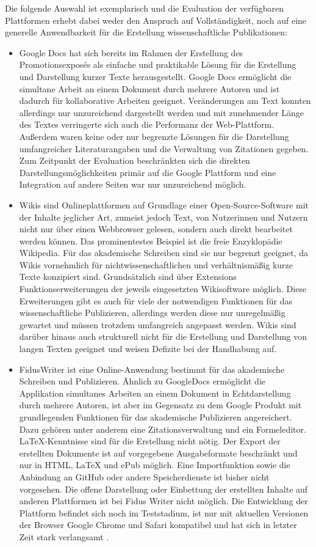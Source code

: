 Die folgende Auswahl ist exemplarisch und die Evaluation der verfügbaren Plattformen erhebt dabei weder den Anspruch auf Vollständigkeit, noch auf eine generelle Anwendbarkeit für die Erstellung wissenschaftliche Publikationen:
\begin{itemize}
\item Google Docs hat sich bereits im Rahmen der Erstellung des Promotionsexposés als einfache und praktikable Lösung für die Erstellung und Darstellung kurzer Texte herausgestellt. Google Docs ermöglicht die simultane Arbeit an einem Dokument durch mehrere Autoren und ist dadurch für kollaborative Arbeiten geeignet. Veränderungen am Text konnten allerdings nur unzureichend dargestellt werden und mit zunehmender Länge des Textes verringerte sich auch die Performanz der Web-Plattform. Außerdem waren keine oder nur begrenzte Lösungen für die Darstellung umfangreicher Literaturangaben und die Verwaltung von Zitationen gegeben. Zum Zeitpunkt der Evaluation beschränkten sich die direkten Darstellungsmöglichkeiten primär auf die Google Plattform und eine Integration auf andere Seiten war nur unzureichend möglich.
\item Wikis sind Onlineplattformen auf Grundlage einer Open-Source-Software mit der Inhalte jeglicher Art, zumeist jedoch Text, von Nutzerinnen und Nutzern nicht nur über einen Webbrowser gelesen, sondern auch direkt bearbeitet werden können. Das prominentestes Beispiel ist die freie Enzyklopädie Wikipedia. Für das akademische Schreiben sind sie nur begrenzt geeignet, da Wikis vornehmlich für nichtwissenschaftlichen und verhältnismäßig kurze Texte konzipiert sind. Grundsätzlich sind über Extensions Funktionserweiterungen der jeweils eingesetzten Wikisoftware möglich. Diese Erweiterungen gibt es auch für viele der notwendigen Funktionen für das wissenschaftliche Publizieren, allerdings werden diese nur unregelmäßig gewartet und müssen trotzdem umfangreich angepasst werden. Wikis sind darüber hinaus auch strukturell nicht für die Erstellung und Darstellung von langen Texten geeignet und weisen Defizite bei der Handhabung auf.
\item FidusWriter ist eine Online-Anwendung bestimmt für das akademische Schreiben und Publizieren. Ähnlich zu GoogleDocs ermöglicht die Applikation simultanes Arbeiten an einem Dokument in Echtdarstellung durch mehrere Autoren, ist aber im Gegensatz zu dem Google Produkt mit grundlegenden Funktionen für das akademische Publizieren angereichert. Dazu gehören unter anderem eine Zitationsverwaltung und ein Formeleditor. LaTeX-Kenntnisse sind für die Erstellung nicht nötig. Der Export der erstellten Dokumente ist auf vorgegebene Ausgabeformate beschränkt und nur in HTML, LaTeX und ePub möglich. Eine Importfunktion sowie die Anbindung an GitHub oder andere Speicherdienste ist bisher nicht vorgesehen. Die offene Darstellung oder Einbettung der erstellten Inhalte auf anderen Plattformen ist bei Fidus Writer nicht möglich. Die Entwicklung der Plattform befindet sich noch im Teststadium, ist nur mit aktuellen Versionen der Browser Google Chrome und Safari kompatibel und hat sich in letzter Zeit stark verlangsamt \cite{fidus_2015}.

\end{itemize}
